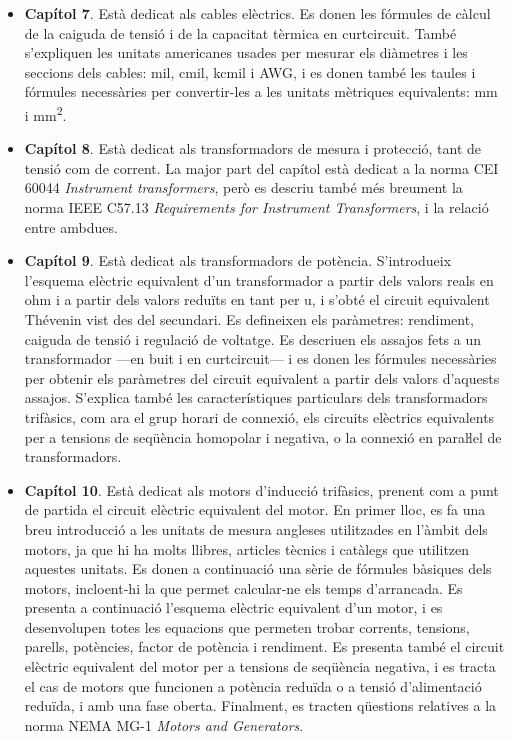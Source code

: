 \begin{itemize}
\begin{itemize}
			\item \textbf{Capítol 7}. Està dedicat als cables elèctrics. Es donen les fórmules de càlcul de la caiguda de tensió i de la capacitat tèrmica en curtcircuit. També s'expliquen  les unitats americanes usades per mesurar els diàmetres i les seccions dels cables: mil, cmil, kcmil i AWG, i es donen també les taules i fórmules necessàries per convertir-les a les  unitats mètriques equivalents: mm i \unit{mm^2}.
			\item \textbf{Capítol 8}. Està dedicat als transformadors de mesura i protecció, tant de tensió com de corrent. La major part del capítol està dedicat a la norma CEI 60044 \textit{Instrument transformers}, però es descriu també més breument  la norma IEEE C57.13 	\textit{	Requirements for Instrument Transformers}, i la relació entre ambdues.
			\item \textbf{Capítol 9}. Està dedicat als transformadors de potència. S'introdueix l'esquema elèctric equivalent d'un transformador a partir dels valors reals en  ohm i a partir dels valors reduïts en tant per u, i s'obté el circuit equivalent Thévenin vist des del secundari. Es defineixen els paràmetres: rendiment,  caiguda de tensió i regulació de voltatge. Es descriuen els assajos fets a un transformador  ---en buit i en curtcircuit--- i es donen les fórmules necessàries per obtenir els paràmetres del circuit equivalent a partir dels valors d'aquests assajos. S'explica també les característiques particulars dels transformadors trifàsics, com ara el grup horari de connexió,  els circuits elèctrics equivalents per a tensions de seqüència  homopolar i  negativa, o la connexió en paraŀlel de transformadors.
			\item \textbf{Capítol 10}. Està dedicat als motors d'inducció trifàsics, prenent com a punt de partida el circuit elèctric equivalent del motor. En primer lloc, es fa una breu introducció  a les unitats de mesura angleses utilitzades en l'àmbit dels motors, ja que hi ha molts llibres, articles tècnics i catàlegs que utilitzen aquestes unitats. Es donen a continuació una sèrie de fórmules bàsiques dels motors, incloent-hi la que permet calcular-ne els temps d'arrancada. Es presenta a continuació l'esquema elèctric equivalent d'un motor, i es desenvolupen totes les equacions que permeten trobar   corrents, tensions, parells, potències, factor de potència i rendiment. Es presenta també el circuit elèctric equivalent del motor per a tensions 
			de seqüència negativa, i es tracta el cas de motors que funcionen a potència reduïda o a tensió d'alimentació reduïda, i amb una fase oberta. Finalment,  es tracten qüestions relatives a la norma NEMA MG-1 \textit{Motors and Generators}. 

\end{itemize}
\end{itemize}
